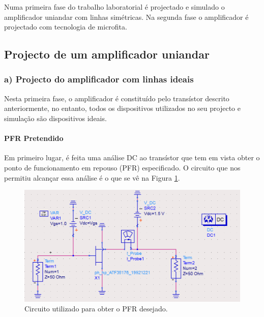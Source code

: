 \documentclass[11pt]{article}
\numberwithin{equation}{section}
\begin{document}
Numa primeira fase do trabalho laboratorial é projectado e simulado o amplificador uniandar com linhas simétricas. Na segunda fase o amplificador é projectado com tecnologia de microfita.

\subsection{Projecto de um amplificador uniandar}

\subsubsection{a) Projecto do amplificador com linhas ideais}

Nesta primeira fase, o amplificador é constituído pelo transístor descrito anteriormente, no entanto, todos os dispositivos utilizados no seu projecto e simulação são dispositivos ideais.

\paragraph{PFR Pretendido} \hspace{0pt} 

Em primeiro lugar, é feita uma análise DC ao transístor que tem em vista obter o ponto de funcionamento em repouso (PFR) especificado. O circuito que nos permitiu alcançar essa análise é o que se vê na Figura \ref{fig:Circuito_0}.

\begin{figure}[H]
	\centering
	\includegraphics[keepaspectratio=true, scale=0.41]{exps/Circuito_0}
	\vspace{-0.5em}
	\caption{Circuito utilizado para obter o PFR desejado.}
	\label{fig:Circuito_0}
	\vspace{-0.8em}
\end{figure} 
\end{document}
